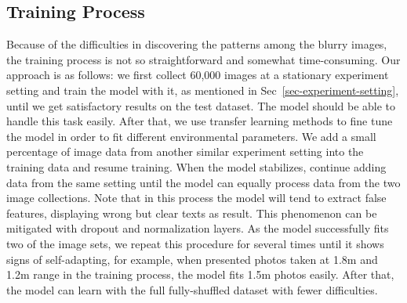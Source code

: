 \subsection{Training Process}
Because of the difficulties in discovering the patterns among the blurry images, the training process is not so straightforward and somewhat time-consuming. Our approach is as follows: we first collect 60,000 images at a stationary experiment setting and train the model with it, as mentioned in Sec~\ref{sec-experiment-setting}, until we get satisfactory results on the test dataset. The model should be able to handle this task easily. After that, we use transfer learning methods to fine tune the model in order to fit different environmental parameters. We add a small percentage of image data from another similar experiment setting into the training data and resume training. When the model stabilizes, continue adding data from the same setting until the model can equally process data from the two image collections. Note that in this process the model will tend to extract false features, displaying wrong but clear texts as result. This phenomenon can be mitigated with dropout and normalization layers. As the model successfully fits two of the image sets, we repeat this procedure for several times until it shows signs of self-adapting, for example, when presented photos taken at 1.8m and 1.2m range in the training process, the model fits 1.5m photos easily. After that, the model can learn with the full fully-shuffled dataset with fewer difficulties.


